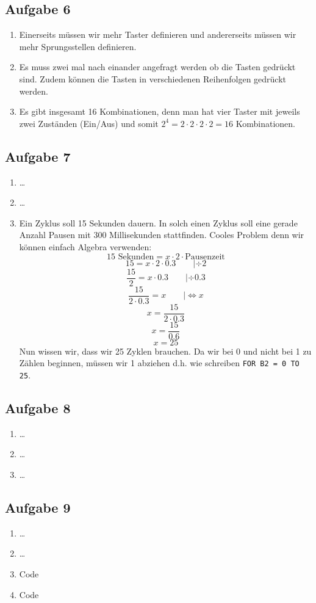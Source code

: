 \ifteacher
\newpage
\subsection{Aufgabe 6}
\begin{enumerate}[label=(\alph*)]
	\item Einerseits müssen wir mehr Taster definieren und andererseits
	müssen wir mehr Sprungsstellen definieren.
	
	\item Es muss zwei mal nach einander angefragt werden ob die Tasten
	gedrückt sind. Zudem können die Tasten in verschiedenen Reihenfolgen
	gedrückt werden.
	
	\item Es gibt insgesamt 16 Kombinationen, denn man hat vier Taster
	mit jeweils zwei Zuständen (Ein/Aus) und somit 
	$2^4=2 \cdot 2 \cdot 2 \cdot 2=16$
	Kombinationen.
\end{enumerate}
\fi

\ifteacher
\newpage
\subsection{Aufgabe 7}
\begin{enumerate}[label=(\alph*)]
\item \dots
\item \dots 
\item Ein Zyklus soll 15 Sekunden dauern. In solch einen Zyklus soll eine gerade
Anzahl Pausen mit 300 Millisekunden stattfinden. Cooles Problem denn wir können 
einfach Algebra verwenden:
\[  \text{15 Sekunden} = x \cdot 2 \cdot \text{Pausenzeit} \]
\[  15 = x \cdot 2 \cdot 0.3 \qquad |\div 2 \]
\[  \frac{15}{2} = x \cdot 0.3 \qquad |\div 0.3 \]
\[ \frac{15}{2 \cdot 0.3} = x  \qquad |\Leftrightarrow x \]
\[ x = \frac{15}{2 \cdot 0.3} \]
\[ x = \frac{15}{0.6} \]
\[ x = 25 \]
Nun wissen wir, dass wir 25 Zyklen brauchen. Da wir bei 0 und nicht bei 1 zu Zählen 
beginnen, müssen wir 1 abziehen d.h. wie schreiben \lstinline{FOR B2 = 0 TO 25}.

\end{enumerate}
\fi

\ifteacher
\newpage
\subsection{Aufgabe 8}
\begin{enumerate}[label=(\alph*)]
\item \dots
\item \dots
\item \dots
\end{enumerate}
\fi

\ifteacher
\newpage
\subsection{Aufgabe 9}
\begin{enumerate}[label=(\alph*)]
\item \dots
\item \dots
\item Code \\ 
\item Code \\ 
\end{enumerate}
\fi